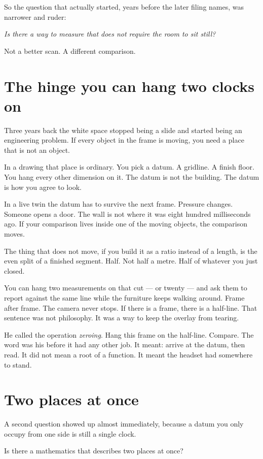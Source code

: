 \documentclass[11pt,a4paper]{article}
\begin{document}
So the question that actually started, years before the later filing names, was narrower and ruder:

\textit{Is there a way to measure that does not require the room to sit still?}

Not a better scan.
A different comparison.

\section{The hinge you can hang two clocks on}

Three years back the white space stopped being a slide and started being an engineering problem.
If every object in the frame is moving, you need a place that is not an object.

In a drawing that place is ordinary.
You pick a datum.
A gridline.
A finish floor.
You hang every other dimension on it.
The datum is not the building.
The datum is how you agree to look.

In a live twin the datum has to survive the next frame.
Pressure changes.
Someone opens a door.
The wall is not where it was eight hundred milliseconds ago.
If your comparison lives inside one of the moving objects, the comparison moves.

The thing that does not move, if you build it as a ratio instead of a length, is the even split of a finished segment.
Half.
Not half a metre.
Half of whatever you just closed.

You can hang two measurements on that cut --- or twenty --- and ask them to report against the same line while the furniture keeps walking around.
Frame after frame.
The camera never stops.
If there is a frame, there is a half-line.
That sentence was not philosophy.
It was a way to keep the overlay from tearing.

He called the operation \emph{zeroing}.
Hang this frame on the half-line.
Compare.
The word was his before it had any other job.
It meant: arrive at the datum, then read.
It did not mean a root of a function.
It meant the headset had somewhere to stand.

\section{Two places at once}

A second question showed up almost immediately, because a datum you only occupy from one side is still a single clock.

Is there a mathematics that describes two places at once?
\end{document}
